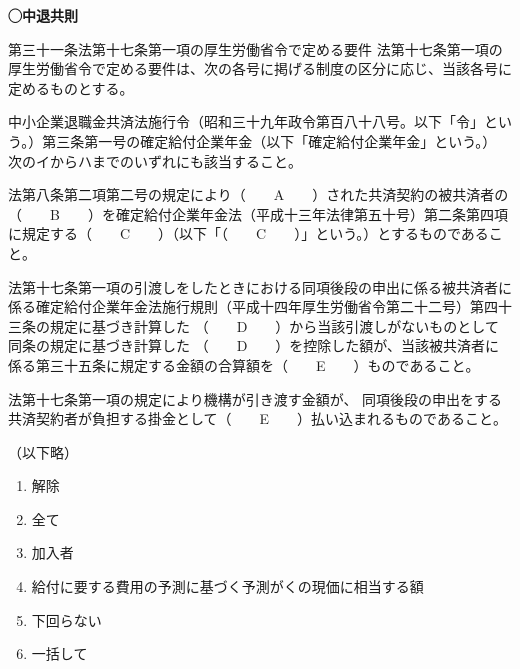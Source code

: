 \begin{fillblank}[数理人試験 H30 問題1 設問6]
    \noindent \textbf{◯中退共則}
  \begin{lawstructure}
    \begin{lawarticle}{第三十一条}{法第十七条第一項の厚生労働省令で定める要件}
      法第十七条第一項の厚生労働省令で定める要件は、次の各号に掲げる制度の区分に応じ、当該各号に定めるものとする。

中小企業退職金共済法施行令（昭和三十九年政令第百八十八号。以下「令」という。）第三条第一号の確定給付企業年金（以下「確定給付企業年金」という。）　次のイからハまでのいずれにも該当すること。

法第八条第二項第二号の規定により（　　A　　）された共済契約の被共済者の（　　B　　）を確定給付企業年金法（平成十三年法律第五十号）第二条第四項に規定する（　　C　　）（以下「（　　C　　）」という。）とするものであること。

法第十七条第一項の引渡しをしたときにおける同項後段の申出に係る被共済者に係る確定給付企業年金法施行規則（平成十四年厚生労働省令第二十二号）第四十三条の規定に基づき計算した
（　　D　　）から当該引渡しがないものとして同条の規定に基づき計算した
（　　D　　）を控除した額が、当該被共済者に係る第三十五条に規定する金額の合算額を（　　E　　）ものであること。

法第十七条第一項の規定により機構が引き渡す金額が、
同項後段の申出をする共済契約者が負担する掛金として（　　E　　）払い込まれるものであること。
    
（以下略）
\end{lawarticle}
  \end{lawstructure}
\end{fillblank}

\begin{answerbox}
  \begin{enumerate}[A:]
    \item 解除
    \item 全て
    \item 加入者
    \item 給付に要する費用の予測に基づく予測がくの現価に相当する額
    \item 下回らない
    \item 一括して
  \end{enumerate}
\end{answerbox}

